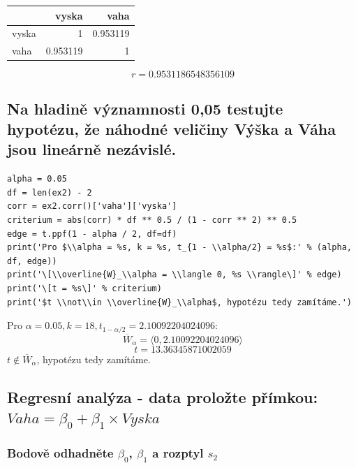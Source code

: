 \documentclass[11pt,titlepage]{article}
\begin{document}
\begin{center}
\begin{tabular}{lrr}
 & vyska & vaha\\
\hline
vyska & 1 & 0.953119\\
vaha & 0.953119 & 1\\
\end{tabular}
\end{center}

\[r = 0.9531186548356109\]

\subsection{Na hladině významnosti 0,05 testujte hypotézu, že náhodné veličiny Výška a Váha jsou lineárně nezávislé.}
\label{sec:orgcf9f8ea}

\begin{listing}[htbp]
\begin{verbatim}
alpha = 0.05
df = len(ex2) - 2
corr = ex2.corr()['vaha']['vyska']
criterium = abs(corr) * df ** 0.5 / (1 - corr ** 2) ** 0.5
edge = t.ppf(1 - alpha / 2, df=df)
print('Pro $\\alpha = %s, k = %s, t_{1 - \\alpha/2} = %s$:' % (alpha, df, edge))
print('\[\\overline{W}_\\alpha = \\langle 0, %s \\rangle\]' % edge)
print('\[t = %s\]' % criterium)
print('$t \\not\\in \\overline{W}_\\alpha$, hypotézu tedy zamítáme.')
\end{verbatim}
\end{listing}

Pro \(\alpha = 0.05, k = 18, t_{1 - \alpha/2} = 2.10092204024096\):
\[\overline{W}_\alpha = \langle 0, 2.10092204024096 \rangle\]
\[t = 13.36345871002059\]
\(t \not\in \overline{W}_\alpha\), hypotézu tedy zamítáme.

\newpage
\subsection{Regresní analýza - data proložte přímkou: \(Vaha = \beta_0 + \beta_1 \times Vyska\)}
\label{sec:org0b75807}
\subsubsection{Bodově odhadněte \(\beta_0\), \(\beta_1\) a rozptyl \(s_2\)}
\label{sec:org5b2d748}
\end{document}
